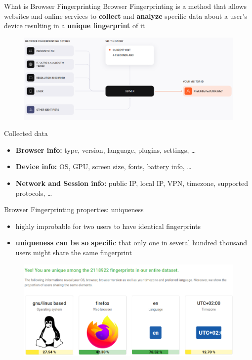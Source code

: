 \begin{frame}{What is Browser Fingerprinting}
  Browser Fingerprinting is a method that allows websites and online services to \textbf{collect} and \textbf{analyze} specific data about a user's device resulting in a \textbf{unique fingerprint} of it
  \begin{figure}
    \centering
    \includegraphics[width=\linewidth]{images/fingerprint.png}
  \end{figure}
\end{frame}

\begin{frame}{Collected data}
  \begin{itemize}
    \item \textbf{Browser info:} type, version, language, plugins, settings, \dots
          \vspace{1cm}
    \item \textbf{Device info:} OS, GPU, screen size, fonts, battery info, \dots
          \vspace{1cm}
    \item \textbf{Network and Session info:} public IP, local IP, VPN, timezone, supported protocols, \dots
  \end{itemize}
\end{frame}

\begin{frame}{Browser Fingerprinting properties: uniqueness}
  \begin{itemize}
    \item highly improbable for two users to have identical fingerprints
    \item \textbf{uniqueness can be so specific} that only one in several hundred thousand users might share the same fingerprint
  \end{itemize}
  \begin{figure}
    \centering
    \includegraphics[width=\linewidth]{images/uniqueness.png}
  \end{figure}
\end{frame}

